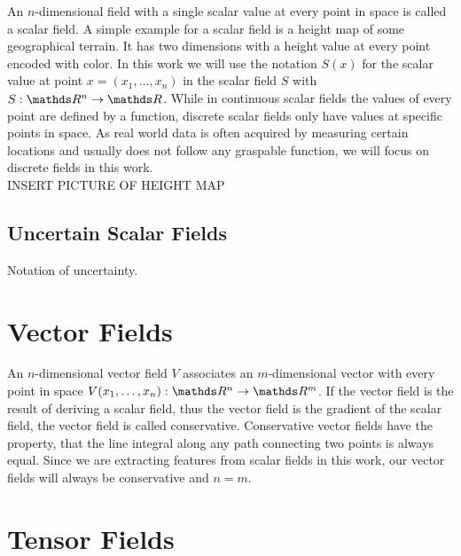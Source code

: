 An $n$-dimensional field with a single scalar value at every point in
space is called a scalar field. A simple example for a scalar field is a
height map of some geographical terrain. It has two dimensions with a
height value at every point encoded with color. In this work we will use
the notation $S(x)$ for the scalar value at point $x = (x_1,\dots,x_n)$
in the scalar field $S$ with $S: \real^n \rightarrow \real$. While in
continuous scalar fields the values of every point are defined by a
function, discrete scalar fields only have values at specific points in
space. As real world data is often acquired by measuring certain
locations and usually does not follow any graspable function, we will
focus on discrete fields in this work.\\
INSERT PICTURE OF HEIGHT MAP

\subsection{Uncertain Scalar Fields}

Notation of uncertainty.

\section{Vector Fields}

An $n$-dimensional vector field $V$ associates an $m$-dimensional vector
with every point in space $V(x_1,\dots,x_n):\real^n \rightarrow \real^m$.
If the vector field is the result of deriving a scalar field, thus the 
vector field is the gradient of the scalar field, the vector field is
called conservative. Conservative vector fields have the property, that
the line integral along any path connecting two points is always equal.
Since we are extracting features from scalar fields in this work, our
vector fields will always be conservative and $n = m$.

\section{Tensor Fields}

